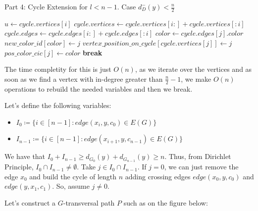 \begin{algorithm}[H]
    \caption{Part 4: Cycle Extension for \( l < n - 1 \). Case \( d^-_D(y) < \frac{n}{2} \)}
    \begin{algorithmic}[1]
                \State $u \gets cycle.vertices[i]$
                    \State $cycle.vertices \gets cycle.vertices[i:] + cycle.vertices[:i]$
                    \State $cycle.edges \gets cycle.edges[i:] + cycle.edges[:i]$
                \EndIf
                    \State $color \gets cycle.edges[j].color$
                    \State $new\_color\_id[color] \gets j$
                    \State $vertex\_position\_on\_cycle[cycle.vertices[j]] \gets j$
                    \State $pos\_color\_cic[j] \gets color$
                \EndFor
                \State \textbf{break}
            \EndFor
        \EndFunction
    \end{algorithmic}
\end{algorithm}

The time completity for this is just $O(n)$, as we iterate over the vertices and
as soon as we find a vertex with in-degree greater than $\frac{n}{2} - 1$, we make 
$O(n)$ operations to rebuild the needed variables and then we break.

Let's define the following variables:

\begin{itemize}
    \item $I_0 \coloneqq \{i \in [n - 1]: edge(x_i, y, c_0) \in E(G)\}$
    \item $I_{n-1} \coloneqq \{i \in [n - 1]: edge(x_{i+1}, y, c_{n-1}) \in E(G)\}$
\end{itemize}

We have that $I_0 + I_{n-1} \geq d_{G_0}(y) + d_{G_{n-1}}(y) \geq n$. Thus, 
from Dirichlet Principle, $I_0 \cap I_{n-1} \neq \emptyset$. Take $j \in I_0 \cap I_{n-1}$.
If $j = 0$, we can just remove the edge $x_0$ and build the cycle of length $n$ 
adding crossing edges $edge(x_0, y, c_0)$ and $edge(y, x_1, c_1)$. So, assume $j \neq 0$.

Let's construct a $G$-transversal path $P$ such as on the figure below:

